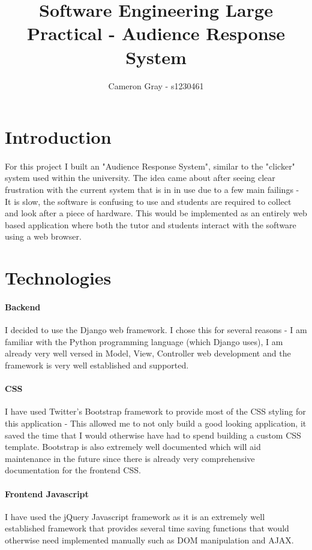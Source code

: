 \documentclass[10pt]{report}
\title{Software Engineering Large Practical - Audience Response System}
\author{Cameron Gray - s1230461}
\begin{document}
	\maketitle
	
	\section*{Introduction}
	\paragraph{}
	For this project I built an "Audience Response System", similar to the "clicker" system used within
	the university.  The idea came about after seeing clear frustration with the current system that is in
	in use due to a few main failings - It is slow, the software is confusing to use and students are
	required to collect and look after a piece of hardware.  This would be implemented as an entirely web
	based application where both the tutor and students interact with the software using a web browser.
	
	\section*{Technologies}
	\paragraph{Backend}	
	I decided to use the Django web framework.  I chose this for several reasons - I am
	familiar with the Python programming language (which Django uses), I am already very well versed in
	Model, View, Controller web development and the framework is very well established and supported.
	
	\paragraph{CSS}
	I have used Twitter's Bootstrap framework to provide most of the CSS styling for this application -
	This allowed me to not only build a good looking application, it saved the time that I would otherwise
	have had to spend building a custom CSS template.  Bootstrap is also extremely well documented which
	will aid maintenance in the future since there is already very comprehensive documentation for the
	frontend CSS.
	
	\paragraph{Frontend Javascript}
	I have used the jQuery Javascript framework as it is an extremely well established framework that
	provides several time saving functions that would otherwise need implemented manually such as DOM
	manipulation and AJAX.
	
\end{document}
